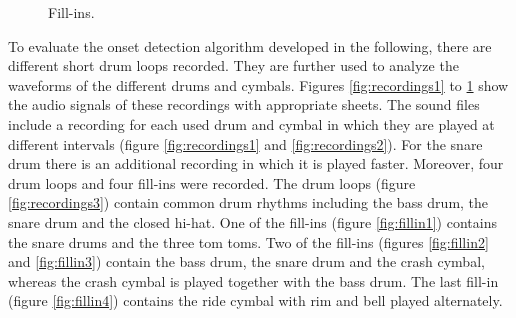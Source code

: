 \begin{figure}[tbp]
	\centering
	\qquad
	\caption{Fill-ins.}
	\label{fig:recordings4}
\end{figure}

To evaluate the onset detection algorithm developed in the following, there are different short drum loops recorded. They are further used to analyze the waveforms of the different drums and cymbals. Figures \ref{fig:recordings1} to \ref{fig:recordings4} show the audio signals of these recordings with appropriate sheets. The sound files include a recording for each used drum and cymbal in which they are played at different intervals (figure \ref{fig:recordings1} and \ref{fig:recordings2}). For the snare drum there is an additional recording in which it is played faster. Moreover, four drum loops and four fill-ins were recorded. The drum loops (figure \ref{fig:recordings3}) contain common drum rhythms including the bass drum, the snare drum and the closed hi-hat. One of the fill-ins (figure \ref{fig:fillin1}) contains the snare drums and the three tom toms. Two of the fill-ins (figures \ref{fig:fillin2} and \ref{fig:fillin3}) contain the bass drum, the snare drum and the crash cymbal, whereas the crash cymbal is played together with the bass drum. The last fill-in (figure \ref{fig:fillin4}) contains the ride cymbal with rim and bell played alternately.


